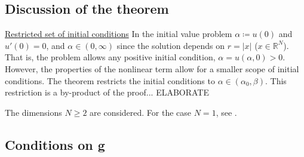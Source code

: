 \subsection{Discussion of the theorem}\hfill

\underline{Restricted set of initial conditions} In the initial value problem $\alpha\coloneqq u(0)$ and $u'(0)=0$, and $\alpha\in(0,\infty)$ since the solution depends on $r=|x|$ ($x\in\mathbb{R}^N$). That is, the problem allows any positive initial condition, $\alpha=u(\alpha,0)>0$. However, the properties of the nonlinear term allow for a smaller scope of initial conditions. The theorem restricts the initial conditions to $\alpha\in(\alpha_0,\beta)$. This restriction is a by-product of the proof... {\color{red} ELABORATE}

The dimensions $N\geq2$ are considered. For the case $N=1$, see \cite{}.

\subsection{Conditions on g}\label{con}\hfill


